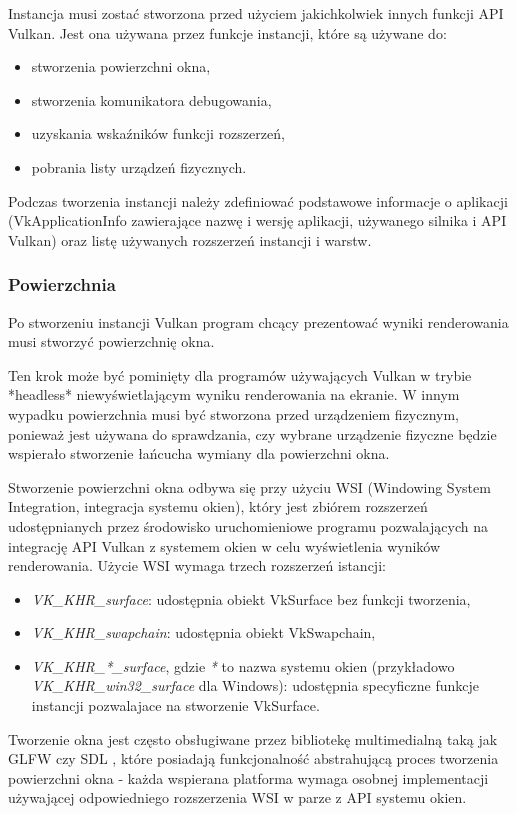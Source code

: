 Instancja musi zostać stworzona przed użyciem jakichkolwiek innych funkcji API Vulkan.
Jest ona używana przez funkcje instancji, które są używane do:
\begin{itemize}
	\item stworzenia powierzchni okna,
	\item stworzenia komunikatora debugowania,
	\item uzyskania wskaźników funkcji rozszerzeń,
	\item pobrania listy urządzeń fizycznych.
\end{itemize}

Podczas tworzenia instancji należy zdefiniować podstawowe informacje o aplikacji (VkApplicationInfo zawierające nazwę i wersję aplikacji, używanego silnika i API Vulkan) oraz listę używanych rozszerzeń instancji i warstw.

\subsubsection{Powierzchnia}

Po stworzeniu instancji Vulkan program chcący prezentować wyniki renderowania musi stworzyć powierzchnię okna.

Ten krok może być pominięty dla programów używających Vulkan w trybie *headless* niewyświetlającym
wyniku renderowania na ekranie. W innym wypadku powierzchnia musi być stworzona przed urządzeniem fizycznym, ponieważ
jest używana do sprawdzania, czy wybrane urządzenie fizyczne będzie wspierało stworzenie łańcucha wymiany dla powierzchni okna.

Stworzenie powierzchni okna odbywa się przy użyciu WSI (Windowing System Integration, integracja systemu okien), który jest zbiórem rozszerzeń udostępnianych przez środowisko uruchomieniowe programu pozwalających na integrację API Vulkan z systemem okien w celu wyświetlenia wyników renderowania.
Użycie WSI wymaga trzech rozszerzeń istancji:
\begin{itemize}
	\item \textit{VK\_KHR\_surface}: udostępnia obiekt VkSurface bez funkcji tworzenia,
	\item \textit{VK\_KHR\_swapchain}: udostępnia obiekt VkSwapchain,
	\item \textit{VK\_KHR\_*\_surface}, gdzie \textit{*} to nazwa systemu okien (przykładowo \textit{VK\_KHR\_win32\_surface} dla Windows): udostępnia specyficzne funkcje instancji pozwalajace na stworzenie VkSurface.
\end{itemize}
Tworzenie okna jest często obsługiwane przez bibliotekę multimedialną taką jak GLFW \cite{GLFW} czy SDL \cite{SDL}, które posiadają funkcjonalność abstrahującą proces tworzenia powierzchni okna - każda wspierana platforma wymaga osobnej implementacji używającej odpowiedniego rozszerzenia WSI w parze z API systemu okien.

